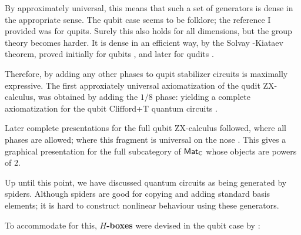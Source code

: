 By approximately universal, this means that such a set of generators is dense in the appropriate sense.
The qubit case seems to be folklore; the reference I provided was for qupits.  Surely this also holds for all dimensions, but the group theory becomes harder.  It is dense in an efficient way, by the Solvay -Kiataev theorem, proved initially for qubits  \cite{Kitaev1997}, and later for qudits \cite[\S 5]{Dawson2006}.

Therefore, by adding any other phases to qupit stabilizer circuits is maximally expressive.  The first approxiately universal axiomatization of the qudit ZX-calculus, was obtained by adding the $1/8$ phase: yielding a complete axiomatization for the qubit  Clifford+T quantum circuits \cite{Jeandel}.

Later complete presentations for the full qubit ZX-calculus followed,  where all phases are allowed; where this fragment is universal on the nose \cite{zxcompleteb,zxcompletea}.  This gives a graphical presentation for the full subcategory of $\mathsf{Mat}_{\mathbb{C}}$ whose objects are powers of $2$.


Up until this point, we have discussed quantum circuits as being generated by spiders. Although spiders are good for copying and adding standard basis elements; it is hard to construct nonlinear behaviour using these generators.

To accommodate for this, {\bf $H$-boxes} were devised in the qubit case by \cite{zh}:

